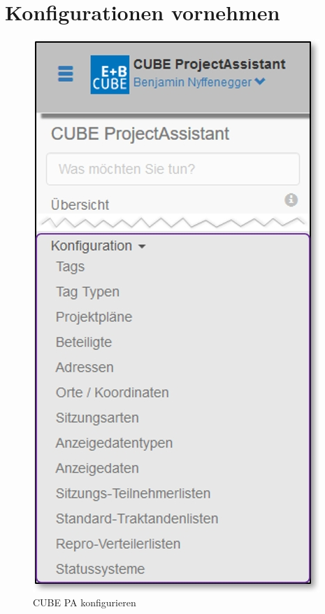 
\clearpage
\section{Konfigurationen vornehmen}
\label{bkm:Ref20190426001}

\begin{figure}   %
  \vspace{-35pt}      %
  \begin{center}
    \includegraphics[width=1\linewidth]{../chapters/13_Konfigurationen/pictures/13_Menu_Konfiguration.jpg}
  \end{center}
  \vspace{-20pt}
  \caption{CUBE PA konfigurieren}
  \vspace{-10pt}
\end{figure}

